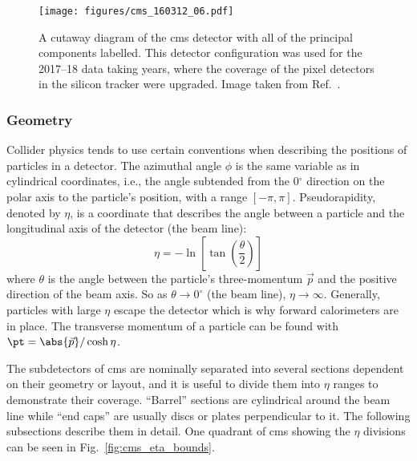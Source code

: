 \begin{figure}[htbp]
    \centering
    \texttt{[image: figures/cms\_160312\_06.pdf]}
    \caption[A cutaway diagram of the CMS detector with all of the principal components labelled. This detector configuration was used for the 2017--18 data taking years]{A cutaway diagram of the \acrshort{cms} detector with all of the principal components labelled. This detector configuration was used for the 2017--18 data taking years, where the coverage of the pixel detectors in the silicon tracker were upgraded. Image taken from Ref.~.}
    \label{fig:detector_cms_cutaway}
\end{figure}




\subsubsection{Geometry}
\label{subsubsec:geometry}

Collider physics tends to use certain conventions when describing the positions of particles in a detector. The azimuthal angle $\phi$ is the same variable as in cylindrical coordinates, i.e., the angle subtended from the 0$^{\circ}$ direction on the polar axis to the particle's position, with a range $[-\pi, \pi]$. Pseudorapidity, denoted by $\eta$, is a coordinate that describes the angle between a particle and the longitudinal axis of the detector (the beam line):
\begin{equation}
    \eta = -\ln \left[ \tan(\frac{\theta}{2}) \right]
    \label{eq:eta_def}
\end{equation}
where $\theta$ is the angle between the particle's three-momentum $\vec{p}$ and the positive direction of the beam axis. So as $\theta \rightarrow \text{0}^{\circ}$ (the beam line), $\eta \rightarrow \infty$. Generally, particles with large $\eta$ escape the detector which is why forward calorimeters are in place. The transverse momentum of a particle can be found with $\pt = \abs{\vec{p}} / \cosh \eta$.

The subdetectors of \acrshort{cms} are nominally separated into several sections dependent on their geometry or layout, and it is useful to divide them into $\eta$ ranges to demonstrate their coverage. ``Barrel'' sections are cylindrical around the beam line while ``end caps'' are usually discs or plates perpendicular to it. The following subsections describe them in detail. One quadrant of \acrshort{cms} showing the $\eta$ divisions can be seen in Fig.~\ref{fig:cms_eta_bounds}.

